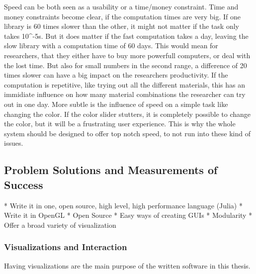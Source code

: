 \begin{itemize}
    Speed can be both seen as a usability or a time/money constraint. 
    Time and money constraints become clear, if the computation times are very big. If one library is 60 times slower than the other, it might not matter if the task only takes 10^-5s. But it does matter if the fast computation takes a day, leaving the slow library with a computation time of 60 days.
    This would mean for researchers, that they either have to buy more powerfull computers, or deal with the lost time.
    But also for small numbers in the second range, a difference of 20 times slower can have a big impact on the researchers productivity. If the computation is repetitive, like trying out all the different materials, this has an immidiate influence on how many material combinations the researcher can try out in one day.
    More subtle is the influence of speed on a simple task like changing the color. If the color slider stutters, it is completely possible to change the color, but it will be a frustrating user experience. 
    This is why the whole system should be designed to offer top notch speed, to not run into these kind of issues.

\end{itemize} 


\subsection{Problem Solutions and Measurements of Success}
* Write it in one, open source, high level, high performance language (Julia)
* Write it in OpenGL
* Open Source
* Easy ways of creating GUIs
* Modularity
* Offer a broad variety of visualization

\subsubsection{Visualizations and Interaction}

Having visualizations are the main purpose of the written software in this thesis.





